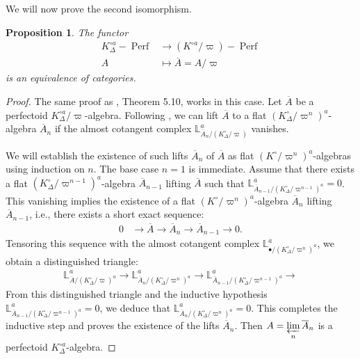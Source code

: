 \documentclass[12pts,a4paper]{amsart}
\newtheorem{proposition}{Proposition}[section]
\DeclareMathOperator{\Perf}{Perf}
\begin{document}
We will now prove the second isomorphism.

\begin{proposition}
    The functor 
    \begin{align*}
        K^{\circ a}_\Delta-\Perf&\to (K^{\circ a}/\varpi)-\Perf\\
                              A &\mapsto \overline{A}=A/\varpi
    \end{align*}
    is an equivalence of categories.
\end{proposition}

\begin{proof}
   The same proof as \cite{Sch}, Theorem 5.10, works in this case. Let $\overline{A}$ be a perfectoid $K^{\circ a}_\Delta/\varpi$-algebra. Following \cite{Sch}, we can lift $\overline{A}$ to a flat $(K^\circ_\Delta/\varpi^n)^a$-algebra $\overline{A}_n$ if the almost cotangent complex $\mathbb{L}^a_{\overline{A}_n/(K^\circ_\Delta/\varpi)}$ vanishes.

We will establish the existence of such lifts $\overline{A}_n$ of $\overline{A}$ as flat $(K^{\circ}/\varpi^n)^a$-algebras using induction on $n$. The base case $n=1$ is immediate. Assume that there exists a flat $(K^\circ_\Delta/\varpi^{n-1})^a$-algebra $\overline{A}_{n-1}$ lifting $\overline{A}$ such that $\mathbb{L}^a_{\overline{A}_{n-1}/(K^\circ_\Delta/\varpi^{n-1})^a} = 0$. This vanishing implies the existence of a flat $(K^\circ/\varpi^n)^a$-algebra $\overline{A}_n$ lifting $\overline{A}_{n-1}$, i.e., there exists a short exact sequence:
\begin{align*}
0 &\longrightarrow \overline{A} \longrightarrow \overline{A}_n \longrightarrow \overline{A}_{n-1} \longrightarrow 0.
\end{align*}
Tensoring this sequence with the almost cotangent complex $\mathbb{L}^a_{\bullet/(K^\circ_\Delta/\varpi^n)^a}$, we obtain a distinguished triangle:
\begin{align*}
\mathbb{L}^a_{\overline{A}/(K^\circ_\Delta/\varpi)^a} \longrightarrow \mathbb{L}^a_{\overline{A}_n/(K^\circ_\Delta/\varpi^n)^a} \longrightarrow \mathbb{L}^a_{\overline{A}_{n-1}/(K^\circ_\Delta/\varpi^{n-1})^a} \longrightarrow
\end{align*}
From this distinguished triangle and the inductive hypothesis $\mathbb{L}^a_{\overline{A}_{n-1}/(K^\circ_\Delta/\varpi^{n-1})^a} = 0$, we deduce that $\mathbb{L}^a_{\overline{A}_n/(K^\circ_\Delta/\varpi^n)^a} = 0$. This completes the inductive step and proves the existence of the lifts $\overline{A}_n$. Then $A=\varprojlim\limits_{n} \overline{A}_n$ is a perfectoid $K^{\circ a}_\Delta$-algebra.
\end{proof}
\end{document}

